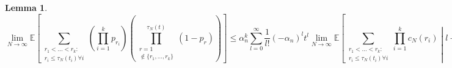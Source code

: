 \documentclass{article}
\newtheorem{lemma}{Lemma}
\newcommand{\E}{\mathbb{E}}
\newcommand{\1}[1]{\mathbbm{1}_{#1}}
\begin{document}
\begin{lemma}
\begin{equation}\label{eq:74}
\lim_{N\to\infty} \E \left[ \sum_{\substack{r_1 <\dots< r_k :\\ r_i \leq \tau_N(t_i) \forall i}}
\left( \prod_{i=1}^k p_{r_i} \right)
\left( \prod_{\substack{r=1 \\ \notin \{r_1,\dots,r_k\} }}^{\tau_N(t)} (1-p_r) \right) \right]
\leq \alpha_n^k \sum_{l=0}^\infty \frac{1}{l!} (-\alpha_n)^l t^l \lim_{N\to\infty} 
\E \left[ \sum_{\substack{r_1 <\dots< r_k :\\ r_i \leq \tau_N(t_i) \forall i}} \prod_{i=1}^k c_N(r_i) \middle| l+k \leq \tau_N(t) \right] 
\end{equation}
\end{lemma}

%
\end{document}
